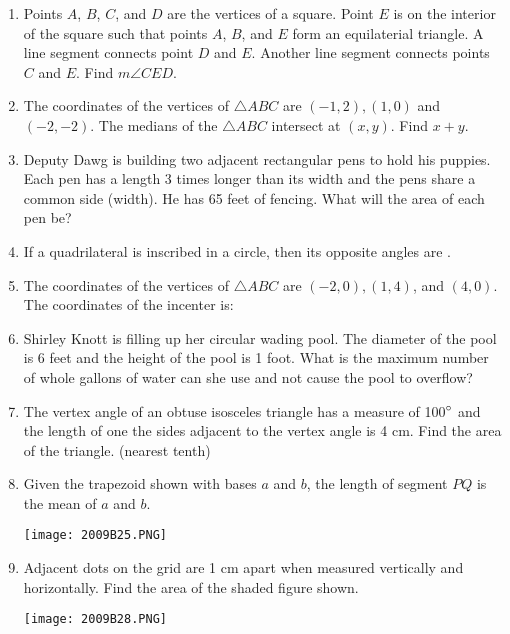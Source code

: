 \documentclass[../uilmath.tex]{subfiles}
\begin{document}
\begin{enumerate}[label=\bfseries\arabic*.]
    \item %
    Points $A$, $B$, $C$, and $D$ are the vertices of a square. Point $E$ is on the interior of the square such that points 
    $A$, $B$, and $E$ form an equilaterial triangle. A line segment connects point $D$ and $E$. Another line segment connects points $C$ and $E$. Find $m\angle CED$.

    \item %
    The coordinates of the vertices of $\triangle ABC$ are $(-1,2),(1,0)$ and $(-2,-2)$. The medians of the $\triangle ABC$ intersect at $(x,y)$. Find $x+y$.

    \item %
    Deputy Dawg is building two adjacent rectangular pens to hold his puppies. Each pen has a length 3 times longer than its width and the pens share a common side (width).
    He has 65 feet of fencing. What will the area of each pen be?

    \item %
    If a quadrilateral is inscribed in a circle, then its opposite angles are \blank .

    \item %
    The coordinates of the vertices of $\triangle ABC$ are $(-2,0), (1,4)$, and $(4,0)$. The coordinates of the incenter is:

    \item %
    Shirley Knott is filling up her circular wading pool. The diameter of the pool is 6 feet and the height of the pool is 1 foot. What is the 
    maximum number of whole gallons of water can she use and not cause the pool to overflow?

    \item %
    The vertex angle of an obtuse isosceles triangle has a measure of 100$\degree$ and the length of one the sides adjacent 
    to the vertex angle is 4 cm. Find the area of the triangle. (nearest tenth)

    \item %
    Given the trapezoid shown with bases $a$ and $b$, the length of segment $PQ$ is the \blank mean of $a$ and $b$.
    \begin{center}
        \texttt{[image: 2009B25.PNG]}
    \end{center}

    \item %
    Adjacent dots on the grid are 1 cm apart when measured vertically and horizontally. Find the area of the shaded figure shown.
    \begin{center}
        \texttt{[image: 2009B28.PNG]}
    \end{center}


\end{enumerate}
\end{document}
